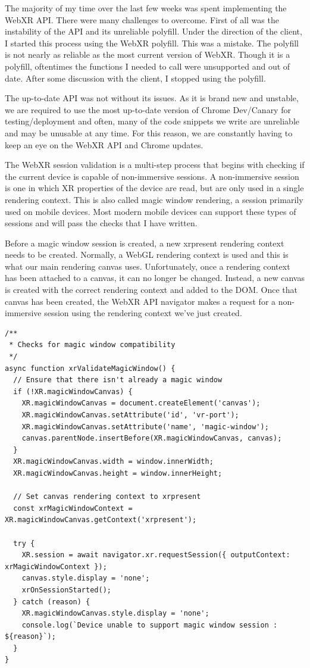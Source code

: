 \documentclass[onecolumn, draftclsnofoot,10pt, compsoc]{IEEEtran}
\begin{document}
    The majority of my time over the last few weeks was spent implementing the WebXR API. There were many challenges to overcome. First of all was the instability of the API and its unreliable polyfill. Under the direction of the client, I started this process using the WebXR polyfill. This was a mistake. The polyfill is not nearly as reliable as the most current version of WebXR. Though it is a polyfill, oftentimes the functions I needed to call were unsupported and out of date. After some discussion with the client, I stopped using the polyfill.
    
    The up-to-date API was not without its issues. As it is brand new and unstable, we are required to use the most up-to-date version of Chrome Dev/Canary for testing/deployment and often, many of the code snippets we write are unreliable and may be unusable at any time. For this reason, we are constantly having to keep an eye on the WebXR API and Chrome updates.
    
    The WebXR session validation is a multi-step process that begins with checking if the current device is capable of non-immersive sessions. A non-immersive session is one in which XR properties of the device are read, but are only used in a single rendering context. This is also called magic window rendering, a session primarily used on mobile devices. Most modern mobile devices can support these types of sessions and will pass the checks that I have written.
    
    Before a magic window session is created, a new xrpresent rendering context needs to be created. Normally, a WebGL rendering context is used and this is what our main rendering canvas uses. Unfortunately, once a rendering context has been attached to a canvas, it can no longer be changed. Instead, a new canvas is created with the correct rendering context and added to the DOM. Once that canvas has been created, the WebXR API navigator makes a request for a non-immersive session using the rendering context we've just created. 
    \begin{lstlisting}
/**
 * Checks for magic window compatibility
 */
async function xrValidateMagicWindow() {
  // Ensure that there isn't already a magic window
  if (!XR.magicWindowCanvas) {
    XR.magicWindowCanvas = document.createElement('canvas');
    XR.magicWindowCanvas.setAttribute('id', 'vr-port');
    XR.magicWindowCanvas.setAttribute('name', 'magic-window');
    canvas.parentNode.insertBefore(XR.magicWindowCanvas, canvas);
  }
  XR.magicWindowCanvas.width = window.innerWidth;
  XR.magicWindowCanvas.height = window.innerHeight;

  // Set canvas rendering context to xrpresent
  const xrMagicWindowContext = XR.magicWindowCanvas.getContext('xrpresent');

  try {
    XR.session = await navigator.xr.requestSession({ outputContext: xrMagicWindowContext });
    canvas.style.display = 'none';
    xrOnSessionStarted();
  } catch (reason) {
    XR.magicWindowCanvas.style.display = 'none';
    console.log(`Device unable to support magic window session : ${reason}`);
  }
}
    \end{lstlisting}
    
\end{document}
